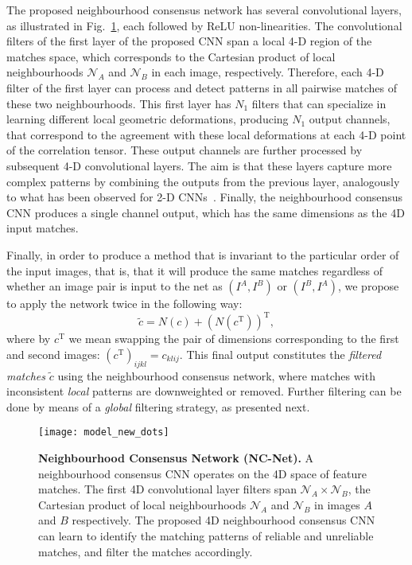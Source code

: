 \documentclass{article}
\begin{document}
 The proposed neighbourhood consensus network has several convolutional layers, as illustrated in Fig.~\ref{fig:model}, each followed by ReLU non-linearities. The convolutional filters of the first layer of the proposed CNN span a local 4-D region of the matches space, which corresponds to the Cartesian product of local neighbourhoods $\mathcal{N}_A$ and $\mathcal{N}_B$ in each image, respectively. Therefore, each 4-D filter of the first layer can process and detect patterns in all pairwise matches of these two neighbourhoods. This first layer has $N_1$ filters that can specialize in learning different local geometric deformations, producing $N_1$ output channels, that correspond to the agreement with these local deformations at each 4-D point of the correlation tensor. 
 These output channels are further processed by subsequent 4-D convolutional layers. The aim is that these layers capture more complex patterns by combining the outputs from the previous layer, analogously to what has been observed for 2-D CNNs~\cite{zeiler2014visualizing}.
 Finally, the neighbourhood consensus CNN produces a single channel output, which has the same dimensions as the 4D input matches.
 
Finally, in order to produce a method that is invariant to the particular order of the input images, that is, that it will produce the same matches regardless of whether an image pair is input to the net as $(I^A,I^B)$ or $(I^B,I^A)$, we propose to apply the network twice in the following way:
\begin{equation}
    \tilde{c}=N(c)+{\left(N(c^\text{T})\right)}^\text{T},
\end{equation}
where by $c^\text{T}$ we mean swapping the pair of dimensions corresponding to the first and second images: $\left(c^\text{T}\right)_{ijkl}=c_{klij}$.
This final output constitutes the \emph{filtered matches} $\tilde{c}$ using the neighbourhood consensus network, where matches with inconsistent \emph{local} patterns are downweighted or removed. Further filtering can be done by means of a  \emph{global} filtering strategy, as presented next.

\begin{figure}[t]
  \centering
    \texttt{[image: model\_new\_dots]}
    \caption{\small \textbf{Neighbourhood Consensus Network (NC-Net).} A neighbourhood consensus CNN operates on the 4D space of feature matches. The first 4D convolutional layer filters
    span $\mathcal{N}_A\times\mathcal{N}_B$, the Cartesian product of local neighbourhoods $\mathcal{N}_A$ and $\mathcal{N}_B$ in images $A$ and $B$ respectively. The proposed 4D neighbourhood consensus CNN can learn to identify the matching patterns of reliable and unreliable matches, and filter the matches accordingly.\label{fig:model}}
\end{figure}
\end{document}
